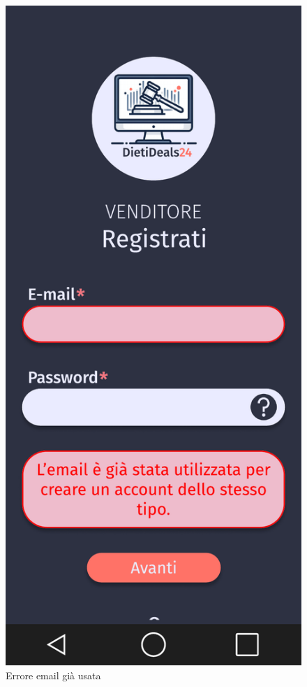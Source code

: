 \begin{figure}[!htb]
\begin{minipage}{0.32\textwidth}
            \includegraphics[width=.7\linewidth]{Immagini/Frames/Errori/E3.pdf}
            \caption{Errore email già usata}
        \end{minipage}\hfill
    \end{figure}
    
